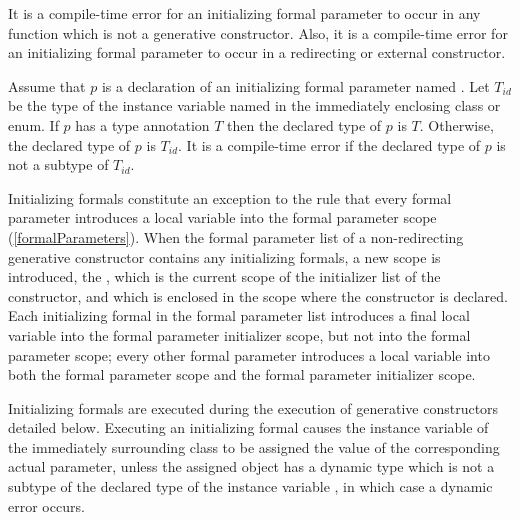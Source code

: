 \documentclass[makeidx]{article}
\begin{document}
\LMHash{}%
It is a compile-time error for an initializing formal parameter
to occur in any function which is not a generative constructor.
Also, it is a compile-time error for an initializing formal parameter
to occur in a redirecting or external constructor.

\LMHash{}%
Assume that $p$ is a declaration of an initializing formal parameter named \id.
Let $T_{id}$ be the type of the instance variable named \id{} in
the immediately enclosing class or enum.
If $p$ has a type annotation $T$ then the declared type of $p$ is $T$.
Otherwise, the declared type of $p$ is $T_{id}$.
It is a compile-time error if the declared type of $p$
is not a subtype of $T_{id}$.

\LMHash{}%
Initializing formals constitute an exception to the rule that
every formal parameter introduces a local variable into
the formal parameter scope (\ref{formalParameters}).
When the formal parameter list of a non-redirecting generative constructor
contains any initializing formals, a new scope is introduced, the
,
which is the current scope of the initializer list of the constructor,
and which is enclosed in the scope where the constructor is declared.
Each initializing formal in the formal parameter list
introduces a final local variable into the formal parameter initializer scope,
but not into the formal parameter scope;
every other formal parameter introduces a local variable into
both the formal parameter scope and the formal parameter initializer scope.


\LMHash{}%
Initializing formals are executed during
the execution of generative constructors detailed below.
Executing an initializing formal 
causes the instance variable \id{} of the immediately surrounding class
to be assigned the value of the corresponding actual parameter,
unless the assigned object has a dynamic type
which is not a subtype of the declared type of the instance variable \id,
in which case a dynamic error occurs.
\end{document}
